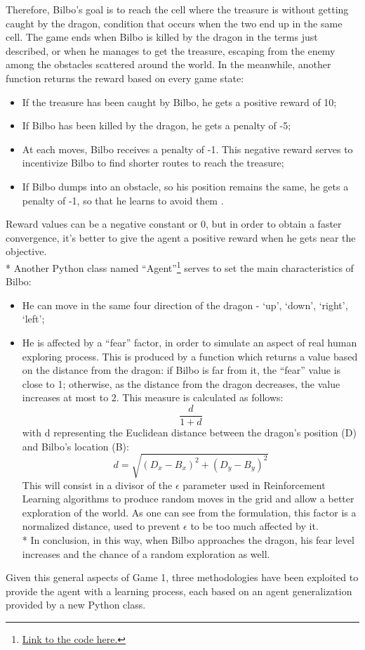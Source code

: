 Therefore, Bilbo's goal is to reach the cell where the treasure is without getting caught by the dragon, condition that occurs when the two end up in the same cell. The game ends when Bilbo is killed by the dragon in the terms just described, or when he manages to get the treasure, escaping from the enemy among the obstacles scattered around the world. In the meanwhile, another function returns the reward based on every game state:
\begin{itemize}[noitemsep, topsep=0ex]
  \item If the treasure has been caught by Bilbo, he gets a positive reward of 10;
  \item If Bilbo has been killed by the dragon, he gets a penalty of -5;
  \item At each moves, Bilbo receives a penalty of -1. This negative reward serves to incentivize Bilbo to find shorter routes to reach the treasure;
  \item If Bilbo dumps into an obstacle, so his position remains the same, he gets a penalty of -1, so that he learns to avoid them \cite{4}.
\end{itemize}
Reward values can be a negative constant or 0, but in order to obtain a faster convergence, it's better to give the agent a positive reward when he gets near the objective.\\*
Another Python class named ``Agent''\footnote{\href{https://github.com/moiraghif/DragonHunting/blob/master/Bilbo\%20World/agents.py}{Link to the code here.}} serves to set the main characteristics of Bilbo:
\begin{itemize}[noitemsep, topsep=0ex]
  \item He can move in the same four direction of the dragon - `up', `down', `right', `left';
  \item He is affected by a ``fear'' factor, in order to simulate an aspect of real human exploring process. This is produced by a function which returns a value based on the distance from the dragon: if Bilbo is far from it, the ``fear'' value is close to 1; otherwise, as the distance from the dragon decreases, the value increases at most to 2. This measure is calculated as follows: 
  $$\frac{d}{1+d}$$
  with d representing the Euclidean distance between the dragon's position (D) and Bilbo's location (B):
  $$d=\sqrt{(D_{x}-B_{x})^2+(D_{y}-B_{y})^2}$$
  This will consist in a divisor of the $\epsilon$ parameter used in Reinforcement Learning algorithms to produce random moves in the grid and allow a better exploration of the world. As one can see from the formulation, this factor is a normalized distance, used to prevent $\epsilon$ to be too much affected by it.\\*
  In conclusion, in this way, when Bilbo approaches the dragon, his fear level increases and the chance of a random exploration as well.
\end{itemize}
Given this general aspects of Game 1, three methodologies have been exploited to provide the agent with a learning process, each based on an agent generalization provided by a new Python class.

